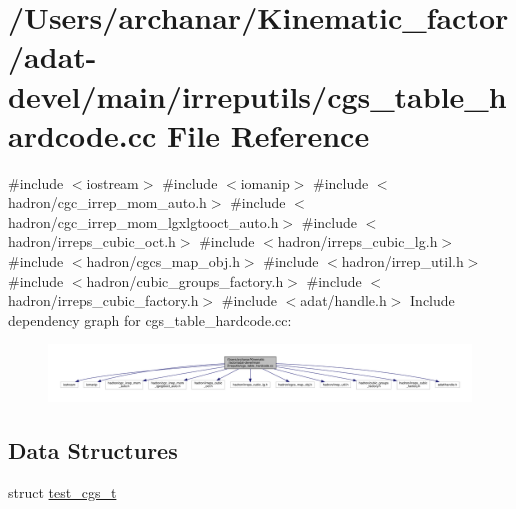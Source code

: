 \hypertarget{adat-devel_2main_2irreputils_2cgs__table__hardcode_8cc}{}\section{/\+Users/archanar/\+Kinematic\+\_\+factor/adat-\/devel/main/irreputils/cgs\+\_\+table\+\_\+hardcode.cc File Reference}
\label{adat-devel_2main_2irreputils_2cgs__table__hardcode_8cc}
{\ttfamily \#include $<$iostream$>$}\newline
{\ttfamily \#include $<$iomanip$>$}\newline
{\ttfamily \#include $<$hadron/cgc\+\_\+irrep\+\_\+mom\+\_\+auto.\+h$>$}\newline
{\ttfamily \#include $<$hadron/cgc\+\_\+irrep\+\_\+mom\+\_\+lgxlgtooct\+\_\+auto.\+h$>$}\newline
{\ttfamily \#include $<$hadron/irreps\+\_\+cubic\+\_\+oct.\+h$>$}\newline
{\ttfamily \#include $<$hadron/irreps\+\_\+cubic\+\_\+lg.\+h$>$}\newline
{\ttfamily \#include $<$hadron/cgcs\+\_\+map\+\_\+obj.\+h$>$}\newline
{\ttfamily \#include $<$hadron/irrep\+\_\+util.\+h$>$}\newline
{\ttfamily \#include $<$hadron/cubic\+\_\+groups\+\_\+factory.\+h$>$}\newline
{\ttfamily \#include $<$hadron/irreps\+\_\+cubic\+\_\+factory.\+h$>$}\newline
{\ttfamily \#include $<$adat/handle.\+h$>$}\newline
Include dependency graph for cgs\+\_\+table\+\_\+hardcode.\+cc\+:
\nopagebreak
\begin{figure}[H]
\begin{center}
\leavevmode
\includegraphics[width=350pt]{d2/d14/adat-devel_2main_2irreputils_2cgs__table__hardcode_8cc__incl}
\end{center}
\end{figure}
\subsection*{Data Structures}
\begin{DoxyCompactItemize}
\item 
struct \mbox{\hyperlink{structtest__cgs__t}{test\+\_\+cgs\+\_\+t}}
\end{DoxyCompactItemize}
